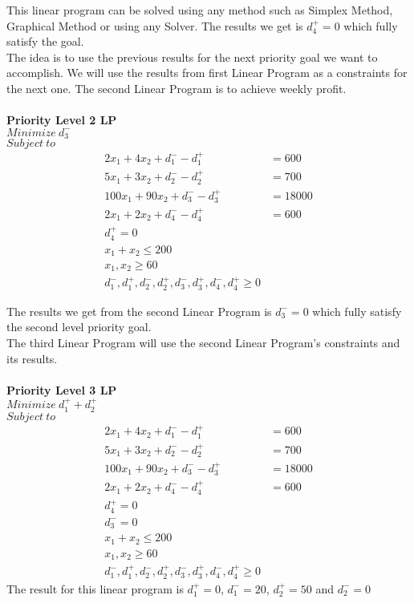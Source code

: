\documentclass{article}
\begin{document}
This linear program can be solved using any method such as Simplex Method, Graphical Method or using any Solver. The results we get is $d_4^{+} = 0$ which fully satisfy the goal. \\

The idea is to use the previous results for the next priority goal we want to accomplish. We will use the results from first Linear Program as a constraints for the next one. The second Linear Program is to achieve weekly profit.\\
\\
\textbf{Priority Level 2 LP}\\
$Minimize \ d_3^{-}$ \\
$Subject \ to$
\begin{align*}
2x_1 + 4x_2 + d_1^{-} - d_1^{+} &= 600\\
5x_1 + 3x_2 + d_2^{-} - d_2^{+} &= 700\\
100x_1 + 90x_2 + d_3^{-} - d_3^{+} &= 18000\\
2x_1 + 2x_2 + d_4^{-} - d_4^{+} &= 600 \\
d_4^{+} = 0 \\
x_1 + x_2 \leq 200 \\
x_1, x_2 \geq 60 \\
d_1^{-}, d_1^{+}, d_2^{-}, d_2^{+}, d_3^{-}, d_3^{+}, d_4^{-}, d_4^{+} \geq 0 
\end{align*}

The results we get from the second Linear Program is $d_3^{-} = 0$ which fully satisfy the second level priority goal. \\

The third Linear Program will use the second Linear Program's constraints and its results. \\
\\
\textbf{Priority Level 3 LP}\\
$Minimize \ d_1^{+} + d_2^{+}$ \\
$Subject \ to$
\begin{align*}
2x_1 + 4x_2 + d_1^{-} - d_1^{+} &= 600\\
5x_1 + 3x_2 + d_2^{-} - d_2^{+} &= 700\\
100x_1 + 90x_2 + d_3^{-} - d_3^{+} &= 18000\\
2x_1 + 2x_2 + d_4^{-} - d_4^{+} &= 600 \\
d_4^{+} = 0 \\
d_3^{-} = 0  \\
x_1 + x_2 \leq 200 \\
x_1, x_2 \geq 60 \\
d_1^{-}, d_1^{+}, d_2^{-}, d_2^{+}, d_3^{-}, d_3^{+}, d_4^{-}, d_4^{+} \geq 0 
\end{align*}
The result for this linear program is $d_1^{+} = 0$, $d_1^{-} = 20$, $d_2^{+} = 50$ and $d_2^{-} = 0$ \\
\end{document}
